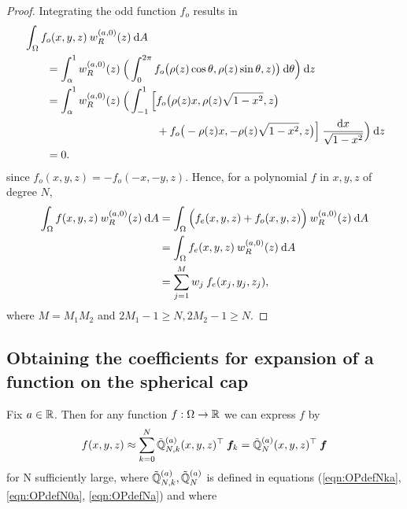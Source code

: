 \documentclass[11pt, oneside]{article}   	%
\begin{document}
\begin{proof}
Integrating the odd function $f_o$ results in
\begin{align*}
	&\int_\Omega f_o(x,y,z) \: w_R^{(a,0)}(z) \: {\rm d} A \\
	&\quad \quad = \int_\alpha^1 w_R^{(a,0)}(z) \: \Big( \int_0^{2\pi} f_o\big(\rho(z)\cos\theta,\rho(z)\sin\theta, z)\big) \: {\rm d} \theta \Big) \: {\rm d} z \\
	&\quad \quad = \int_\alpha^1 w_R^{(a,0)}(z) \: \Big( \int_{-1}^1 \Big[ f_o\big(\rho(z)x,\rho(z)\sqrt{1-x^2}, z\big) \\
	&\quad \quad \quad \quad \quad \quad \quad \quad \quad \quad \quad \quad + f_o\big(-\rho(z)x, - \rho(z)\sqrt{1-x^2}, z\big) \Big] \: \frac{{\rm d} x}{\sqrt{1-x^2}} \Big) \: {\rm d} z \\
	&\quad \quad = 0.
\end{align*}
since $f_o(x,y,z) = - f_o(-x, -y, z)$. Hence, for a polynomial $f$ in $x,y,z$ of degree $N$,
\begin{align*}
	\int_\Omega f(x,y,z) \: w_R^{(a,0)}(z) \: {\rm d} A &= \int_\Omega \Big(f_e(x,y,z) + f_o(x,y,z)\Big) \:  w_R^{(a,0)}(z) \: {\rm d} A  \\
	&= \int_\Omega f_e(x,y,z) \: w_R^{(a,0)}(z) \: {\rm d} A \\
	&= \sum_{j=1}^{M}  w_j \: f_e(x_j, y_j, z_j),
\end{align*}
where $M = M_1 M_2$ and $2M_1 - 1 \ge N, 2M_2 - 1 \ge N$.
\end{proof}


\subsection{Obtaining the coefficients for expansion of a function on the spherical cap}\label{subsection:expandingfunctions}

Fix $a \in \mathbb{R}$. Then for any function $f : \Omega \to \mathbb{R}$ we can express $f$ by
\begin{align*}
	f(x,y,z) \approx \sum_{k=0}^N {\mathbb{\tilde Q}}^{(a)}_{N,k}(x,y,z)^\top \: \bm{f}_k = {\mathbb{\tilde Q}}^{(a)}_{N}(x,y,z)^\top \: \bm{f}
\end{align*}
for N sufficiently large, where ${\mathbb{\tilde Q}}^{(a)}_{N,k}, {\mathbb{\tilde Q}}^{(a)}_{N}$ is defined in equations (\ref{eqn:OPdefNka}, \ref{eqn:OPdefN0a}, \ref{eqn:OPdefNa}) and where
\end{document}
